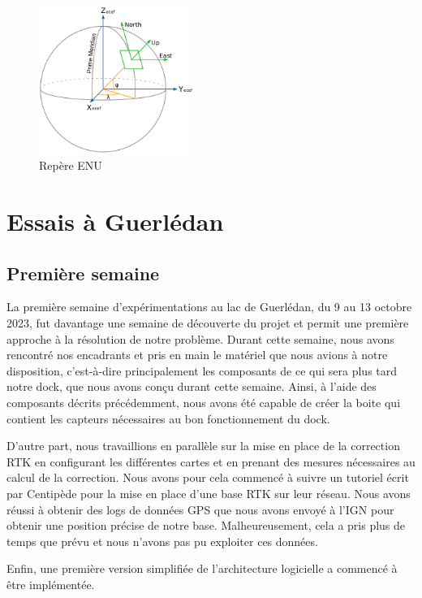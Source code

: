 \documentclass[12pt]{report}
\begin{document}
\begin{figure}[!h]
  \centering
  \includegraphics[width=5cm]{imgs/ENU.png}
  \caption{Repère ENU}
  \label{fig:schema_ENU}
\end{figure}

\chapter{Essais à Guerlédan}

\section{Première semaine}

La première semaine d'expérimentations au lac de Guerlédan, du 9 au 13 octobre 2023, fut davantage une semaine de découverte du projet et permit une première approche à la résolution de notre problème. 
Durant cette semaine, nous avons rencontré nos encadrants et pris en main le matériel que nous avions à notre disposition, c'est-à-dire principalement les composants de ce qui sera plus tard notre dock,
que nous avons conçu durant cette semaine. Ainsi, à l'aide des composants décrits précédemment, nous avons été capable de créer la boite qui contient les capteurs nécessaires au bon fonctionnement du dock. 

D'autre part, nous travaillions en parallèle sur la mise en place de la correction RTK en configurant les différentes cartes et en prenant des mesures nécessaires au calcul de la correction.
Nous avons pour cela commencé à suivre un tutoriel écrit par Centipède pour la mise en place d'une base RTK sur leur réseau. Nous avons réussi à obtenir des logs de données GPS que nous avons envoyé à l'IGN pour obtenir une position précise de notre base.
Malheureusement, cela a pris plus de temps que prévu et nous n'avons pas pu exploiter ces données.

Enfin, une première version simplifiée de l'architecture logicielle a commencé à être implémentée. 
\end{document}

